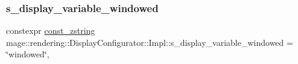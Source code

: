 \subsubsection{\texorpdfstring{s\+\_\+display\+\_\+variable\+\_\+windowed}{s\_display\_variable\_windowed}}
{\footnotesize\ttfamily constexpr \mbox{\hyperlink{namespacemage_abfd9206dc607ceb5d13ec68bf075a5c0}{const\+\_\+zstring}} mage\+::rendering\+::\+Display\+Configurator\+::\+Impl\+::s\+\_\+display\+\_\+variable\+\_\+windowed = \char`\"{}windowed\char`\"{}\hspace{0.3cm}{\ttfamily [static]}, {\ttfamily [private]}}

